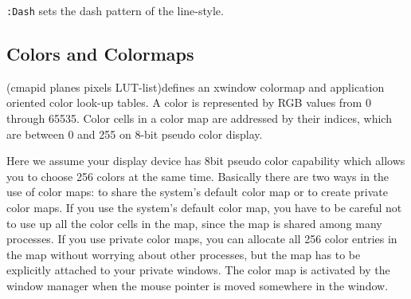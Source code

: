 \begin{refdesc}
{{\tt :Dash} sets the dash pattern of the line-style.}

\end{refdesc}



\subsection{Colors and Colormaps}

\begin{refdesc}
{(cmapid planes pixels LUT-list)}{defines an xwindow colormap
and application oriented color look-up tables.
A color is represented by RGB values from 0 through 65535.
Color cells in a color map are addressed by their indices,
which are between 0 and 255 on 8-bit pseudo color display.}
\end{refdesc}

Here we assume your display device has 8bit pseudo color capability
which allows you to choose 256 colors at the same time.
Basically there are two ways in the use of color maps:
to share the system's default color map or to create private color maps.
If you use the system's default color map, you have to
be careful not to use up all the color cells in the map,
since the map is shared among many processes.
If you use private color maps, you can allocate all 256 color entries
in the map without worrying about other processes,
but  the map has to be explicitly attached to your private windows.
The color map is activated by the window manager
when the mouse pointer is moved somewhere in the window.

